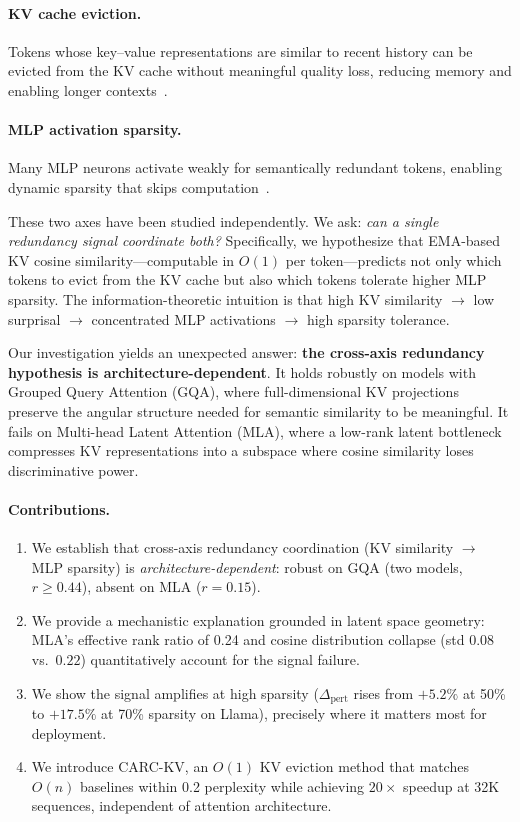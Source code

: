 \documentclass[11pt,a4paper]{article}
\begin{document}
\paragraph{KV cache eviction.}
Tokens whose key--value representations are similar to recent history can be evicted from the KV cache without meaningful quality loss, reducing memory and enabling longer contexts~\cite{zhang2024h2o,li2024snapkv}.

\paragraph{MLP activation sparsity.}
Many MLP neurons activate weakly for semantically redundant tokens, enabling dynamic sparsity that skips computation~\cite{liu2023dejavu,song2024prosparse}.

These two axes have been studied independently.
We ask: \emph{can a single redundancy signal coordinate both?}
Specifically, we hypothesize that EMA-based KV cosine similarity---computable in $O(1)$ per token---predicts not only which tokens to evict from the KV cache but also which tokens tolerate higher MLP sparsity.
The information-theoretic intuition is that high KV similarity $\rightarrow$ low surprisal $\rightarrow$ concentrated MLP activations $\rightarrow$ high sparsity tolerance.

Our investigation yields an unexpected answer: \textbf{the cross-axis redundancy hypothesis is architecture-dependent}.
It holds robustly on models with Grouped Query Attention (GQA), where full-dimensional KV projections preserve the angular structure needed for semantic similarity to be meaningful.
It fails on Multi-head Latent Attention (MLA), where a low-rank latent bottleneck compresses KV representations into a subspace where cosine similarity loses discriminative power.

\paragraph{Contributions.}
\begin{enumerate}
    \item We establish that cross-axis redundancy coordination (KV similarity $\rightarrow$ MLP sparsity) is \emph{architecture-dependent}: robust on GQA (two models, $r \geq 0.44$), absent on MLA ($r = 0.15$).
    \item We provide a mechanistic explanation grounded in latent space geometry: MLA's effective rank ratio of 0.24 and cosine distribution collapse (std $0.08$ vs.\ $0.22$) quantitatively account for the signal failure.
    \item We show the signal amplifies at high sparsity ($\Delta_\text{pert}$ rises from $+5.2\%$ at 50\% to $+17.5\%$ at 70\% sparsity on Llama), precisely where it matters most for deployment.
    \item We introduce CARC-KV, an $O(1)$ KV eviction method that matches $O(n)$ baselines within 0.2 perplexity while achieving $20\times$ speedup at 32K sequences, independent of attention architecture.
\end{enumerate}
\end{document}
